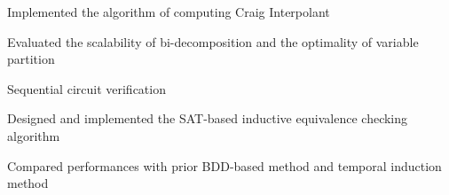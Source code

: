 \begin{myexp}
\begin{myexp}
        \begin{mybullet}
            \item Implemented the algorithm of computing Craig Interpolant
            \item Evaluated the scalability of bi-decomposition and the optimality of variable partition
        \end{mybullet}
    \item Sequential circuit verification
        \begin{mybullet}
            \item Designed and implemented the SAT-based inductive equivalence checking algorithm
            \item Compared performances with prior BDD-based method and temporal induction method
        \end{mybullet}
\end{myexp}
\end{myexp}
